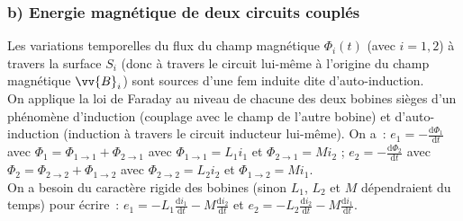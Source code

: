 \documentclass{article}
\renewcommand\overrightarrow{\vv}
\begin{document}
\subsubsection*{b) Energie magnétique de deux circuits couplés}
Les variations temporelles du flux du champ magnétique
$\Phi_{i}(t)$ (avec $i=1,2$) à travers la surface $S_{i}$ (donc à
travers le circuit lui-même à l'origine du champ magnétique
$\overrightarrow{B}_{i}$) sont sources d'une fem induite dite
d'auto-induction. \\
On applique la loi de Faraday au niveau de chacune des deux bobines
sièges d'un phénomène d'induction (couplage avec le champ de l'autre
bobine) et d'auto-induction (induction à travers le circuit
inducteur lui-même). On a : $e_{1} = -\frac{\mathrm{d}\Phi_{1}}{\mathrm{d}t}$ avec
$\Phi_{1} = \Phi_{\mathrm{1 \rightarrow 1}}+ \Phi_{\mathrm{2 \rightarrow 1}}$ avec
$\Phi_{\mathrm{1 \rightarrow 1}} = L_{1}i_{1}$ et $\Phi_{\mathrm{2 \rightarrow 1}} =
Mi_{2}$ ; $e_{2} = -\frac{\mathrm{d}\Phi_{2}}{\mathrm{d}t}$ avec $\Phi_{2} = \Phi_{\mathrm{2
\rightarrow 2}}+ \Phi_{\mathrm{1 \rightarrow 2}}$ avec $\Phi_{\mathrm{2 \rightarrow 2}}
= L_{2}i_{2}$ et $\Phi_{\mathrm{1 \rightarrow 2}} = Mi_{1}$.
\\
On a besoin du caractère rigide des bobines (sinon $L_{1}$, $L_{2}$
et $M$ dépendraient du temps) pour écrire : $e_{1} =
-L_{1}\frac{\mathrm{d}i_{1}}{\mathrm{d}t}-M\frac{\mathrm{d}i_{2}}{\mathrm{d}t}$ et $e_{2} =
-L_{2}\frac{\mathrm{d}i_{2}}{\mathrm{d}t}-M\frac{\mathrm{d}i_{1}}{\mathrm{d}t}$. \\



\begin{wrapfigure}{r}{0.25\textwidth}
\caption{}\label{Fig.6}
\end{wrapfigure}
\end{document}
